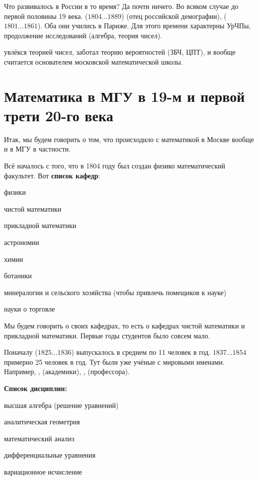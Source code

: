 \documentclass[a4paper,oneside,fleqn,10pt]{article}
\newcommand{\pe}[2]{${#1}\ldots{#2}$}
\begin{document}
Что развивалось в России в то время? Да почти ничего. Во всяком случае до первой половины 19 века.
 (\pe{1804}{1889})
(отец российской демографии), 
(\pe{1801}{1861}). Оба они учились в Париже.
Для этого времени характерны УрЧПы, продолжение исследований  (алгебра, теория чисел).

 увлёкся теорией чисел, заботал теорию вероятностей (ЗБЧ, ЦПТ),
и вообще считается основателем московской математической
школы.


\section{Математика в МГУ в 19-м и первой трети 20-го века}

Итак, мы будем говорить о том, что происходило с математикой в Москве вообще
и в МГУ в частности.

Всё началось с того, что в 1804 году был создан физико математический факультет.
Вот \textbf{список кафедр}:
\begin{nums}{-2}
\item физики
\item чистой математики
\item прикладной математики
\item астрономии
\item химии
\item ботаники
\item минералогии и сельского хозяйства (чтобы привлечь помещиков к науке)
\item науки о торговле
\end{nums}

Мы будем говорить о своих кафедрах, то есть о кафедрах чистой математики
и прикладной математики. Первые годы студентов было совсем мало.

Поначалу (\pe{1825}{1836}) выпускалось в среднем по 11 человек в год.
\pe{1837}{1854} примерно 25 человек в год. Тут были уже учёные с мировыми
именами. Например, ,  (академики), ,  (профессора).

\textbf{Список дисциплин:}

\begin{nums}{-2}
\item высшая алгебра (решение уравнений)
\item аналитическая геометрия
\item математический анализ
\item дифференциальные уравнения
\item вариационное исчисление
\end{nums}
\end{document}

